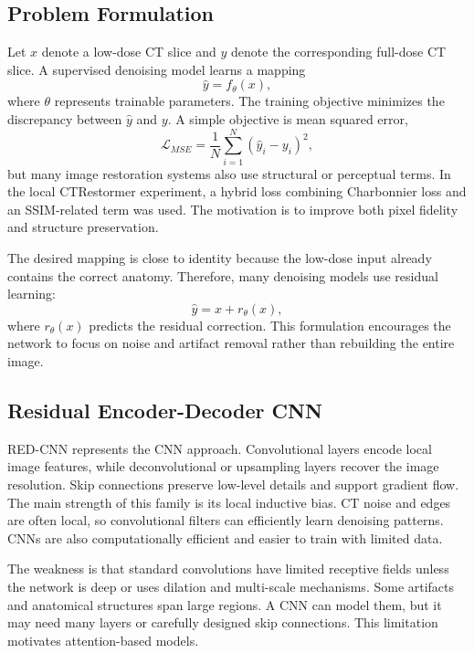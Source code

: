 \documentclass[journal]{IEEEtran}
\begin{document}
\subsection{Problem Formulation}
Let $x$ denote a low-dose CT slice and $y$ denote the corresponding full-dose CT slice. A supervised denoising model learns a mapping
\begin{equation}
\hat{y}=f_{\theta}(x),
\end{equation}
where $\theta$ represents trainable parameters. The training objective minimizes the discrepancy between $\hat{y}$ and $y$. A simple objective is mean squared error,
\begin{equation}
\mathcal{L}_{MSE}=\frac{1}{N}\sum_{i=1}^{N}(\hat{y}_{i}-y_{i})^2,
\end{equation}
but many image restoration systems also use structural or perceptual terms. In the local CTRestormer experiment, a hybrid loss combining Charbonnier loss and an SSIM-related term was used. The motivation is to improve both pixel fidelity and structure preservation.

The desired mapping is close to identity because the low-dose input already contains the correct anatomy. Therefore, many denoising models use residual learning:
\begin{equation}
\hat{y}=x+r_{\theta}(x),
\end{equation}
where $r_{\theta}(x)$ predicts the residual correction. This formulation encourages the network to focus on noise and artifact removal rather than rebuilding the entire image.

\subsection{Residual Encoder-Decoder CNN}
RED-CNN represents the CNN approach. Convolutional layers encode local image features, while deconvolutional or upsampling layers recover the image resolution. Skip connections preserve low-level details and support gradient flow. The main strength of this family is its local inductive bias. CT noise and edges are often local, so convolutional filters can efficiently learn denoising patterns. CNNs are also computationally efficient and easier to train with limited data.

The weakness is that standard convolutions have limited receptive fields unless the network is deep or uses dilation and multi-scale mechanisms. Some artifacts and anatomical structures span large regions. A CNN can model them, but it may need many layers or carefully designed skip connections. This limitation motivates attention-based models.
\end{document}
